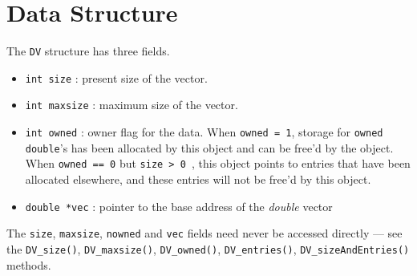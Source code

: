 \par
\section{Data Structure}
\label{section:DV:dataStructure}
\par
\par
The {\tt DV} structure has three fields.
\begin{itemize}
\item
{\tt int size} : present size of the vector.
\item
{\tt int maxsize} : maximum size of the vector.
\item
{\tt int owned} : owner flag for the data.
When {\tt owned = 1}, storage for {\tt owned} {\tt double}'s
has been allocated by this object and can be free'd by the object.
When {\tt owned == 0} but {\tt size > 0 }, this object points to
entries that have been allocated elsewhere, and these entries will
not be free'd by this object.
\item
{\tt double *vec} : 
pointer to the base address of the {\it double} vector
\end{itemize}
The {\tt size}, {\tt maxsize}, {\tt nowned} and {\tt vec} fields 
need never be accessed directly --- 
see the 
{\tt DV\_size()},
{\tt DV\_maxsize()},
{\tt DV\_owned()},
{\tt DV\_entries()},
{\tt DV\_sizeAndEntries()} methods.
